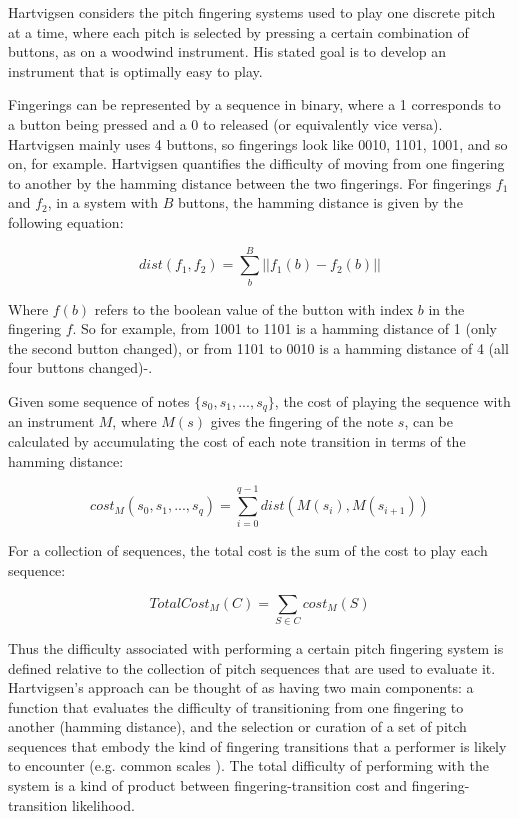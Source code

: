 \documentclass[sigconf]{nimeart}
\begin{document}
Hartvigsen considers the pitch fingering systems used to play one discrete pitch at a time, where each pitch is selected by pressing a certain combination of buttons, as on a woodwind instrument. His stated goal is to develop an instrument that is optimally easy to play.

Fingerings can be represented by a sequence in binary, where a 1 corresponds to a button being pressed and a 0 to released (or equivalently vice versa). Hartvigsen mainly uses 4 buttons, so fingerings look like 0010, 1101, 1001, and so on, for example. Hartvigsen quantifies the difficulty of moving from one fingering to another by the hamming distance between the two fingerings. For fingerings $f_1$ and $f_2$, in a system with $B$ buttons, the hamming distance is given by the following equation:


\begin{equation}dist(f_1, f_2) = \sum_b^B ||f_1(b) - f_2(b)||\end{equation}


Where $f(b)$ refers to the boolean value of the button with index $b$ in the fingering $f$. So for example, from 1001 to 1101 is a hamming distance of 1 (only the second button changed), or from 1101 to 0010 is a hamming distance of 4 (all four buttons changed)-.

Given some sequence of notes $\{s_0, s_1, ..., s_q\}$, the cost of playing the sequence with an instrument $M$, where $M(s)$ gives the fingering of the note $s$, can be calculated by accumulating the cost of each note transition in terms of the hamming distance:


\begin{equation}cost_M(s_0, s_1, ..., s_q) = \sum_{i=0}^{q - 1} dist(M(s_i), M(s_{i+1}))\end{equation}


For a collection of sequences, the total cost is the sum of the cost to play each sequence:


\begin{equation}TotalCost_M(C) = \sum_{S\in C} cost_M(S)\end{equation}


Thus the difficulty associated with performing a certain pitch fingering system is defined relative to the collection of pitch sequences that are used to evaluate it. Hartvigsen's approach can be thought of as having two main components: a function that evaluates the difficulty of transitioning from one fingering to another (hamming distance), and the selection or curation of a set of pitch sequences that embody the kind of fingering transitions that a performer is likely to encounter (e.g. common scales \cite{Hartvigsen2010}). The total difficulty of performing with the system is a kind of product between fingering-transition cost and fingering-transition likelihood.
\end{document}
